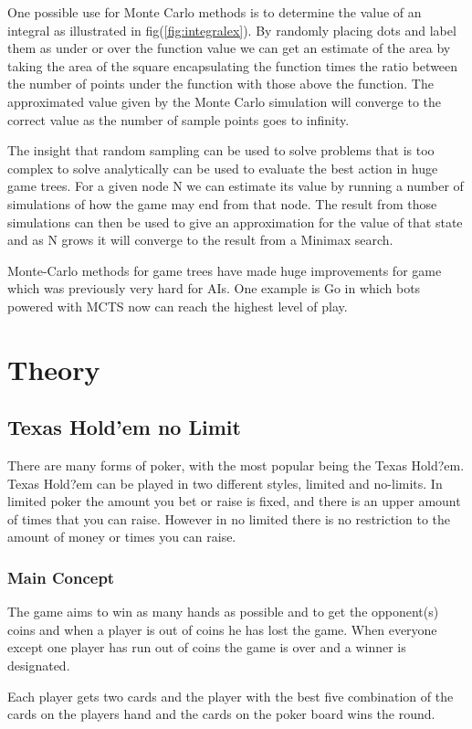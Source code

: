 \documentclass[journal]{vgtc}                %
\begin{document}
One possible use for Monte Carlo methods is to determine the value of an integral as illustrated in fig(\ref{fig:integralex}). By randomly placing dots and label them as under or over the function value we can get an estimate of the area by taking the area of the square encapsulating the function times the ratio between the number of points under the function with those above the function. The approximated value given by the Monte Carlo simulation will converge to the correct value as the number of sample points goes to infinity.

The insight that random sampling can be used to solve problems that is too complex to solve analytically can be used to evaluate the best action in huge game trees. For a given node N we can estimate its value by running a number of simulations of how the game may end from that node. The result from those simulations can then be used to give an approximation for the value of that state and as N grows it will converge to the result from a Minimax search. 

Monte-Carlo methods for game trees have made huge improvements for game which was previously very hard for AIs. One example is Go in which bots powered with MCTS now can reach the highest level of play.

\section{Theory}
\subsection{Texas Hold'em no Limit}
There are many forms of poker, with the most popular being the Texas Hold?em. Texas Hold?em can be played in two different styles, limited and no-limits. In limited poker the amount you bet or raise is fixed, and there is an upper amount of times that you can raise. However in no limited there is no restriction to the amount of money or times you can raise.

\subsubsection{Main Concept}
The game aims to win as many hands as possible and to get the opponent(s) coins and when a player is out of coins he has lost the game. When everyone except one player has run out of coins the game is over and a winner is designated.

Each player gets two cards and the player with the best five combination of the cards on the players hand and the cards on the poker board wins the round. 
\end{document}
